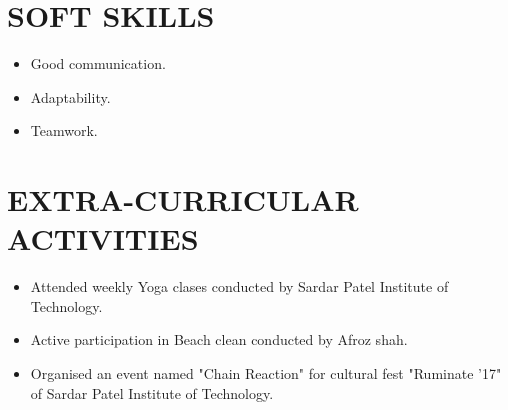 \documentclass{article}
\begin{document}
\section*{\textbf{SOFT SKILLS}}
\begin{itemize}
\item Good communication.
\item Adaptability.
\item Teamwork.
\end{itemize}


\section*{\textbf{EXTRA-CURRICULAR ACTIVITIES}}
\begin{itemize}
\item Attended weekly Yoga clases conducted by Sardar Patel Institute of Technology. 
\item Active participation in Beach clean conducted by Afroz shah.
\item Organised an event named "Chain Reaction" for cultural fest "Ruminate '17" of Sardar Patel Institute of Technology.
\end{itemize}
\end{document}
